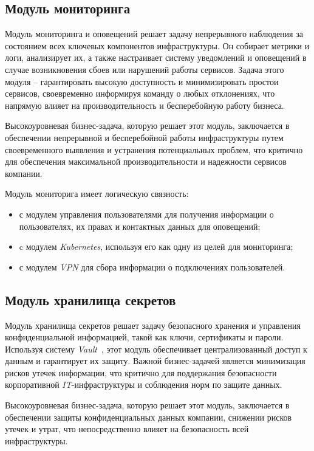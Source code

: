 \subsection{Модуль мониторинга} 
\label{sec:monitoring_alerting_module}

Модуль мониторинга и оповещений решает задачу непрерывного наблюдения за состоянием всех ключевых компонентов инфраструктуры. Он собирает метрики и логи, анализирует их, а также настраивает систему уведомлений и оповещений в случае возникновения сбоев или нарушений работы сервисов. Задача этого модуля -- гарантировать высокую доступность и минимизировать простои сервисов, своевременно информируя команду о любых отклонениях, что напрямую влияет на производительность и бесперебойную работу бизнеса.

Высокоуровневая бизнес-задача, которую решает этот модуль, заключается в обеспечении непрерывной и бесперебойной работы инфраструктуры путем своевременного выявления и устранения потенциальных проблем, что критично для обеспечения максимальной производительности и надежности сервисов компании.

Модуль мониторига имеет логическую связность:
\begin{itemize}
    \item с модулем управления пользователями для получения информации о пользователях, их правах и контактных данных для оповещений;
    \item c модулем \textit{Kubernetes}, используя его как одну из целей для мониторинга;
    \item с модулем \textit{VPN} для сбора информации о подключениях пользователей.
\end{itemize}

\subsection{Модуль хранилища секретов} 
\label{sec:secrets_storage_module}

Модуль хранилища секретов решает задачу безопасного хранения и управления конфиденциальной информацией, такой как ключи, сертификаты и пароли. Используя систему \textit{Vault}~\cite{hashicorpvault}, этот модуль обеспечивает централизованный доступ к данным и гарантирует их защиту. Важной бизнес-задачей является минимизация рисков утечек информации, что критично для поддержания безопасности корпоративной \textit{IT}-инфраструктуры и соблюдения норм по защите данных.

Высокоуровневая бизнес-задача, которую решает этот модуль, заключается в обеспечении защиты конфиденциальных данных компании, снижении рисков утечек и утрат, что непосредственно влияет на безопасность всей инфраструктуры.

